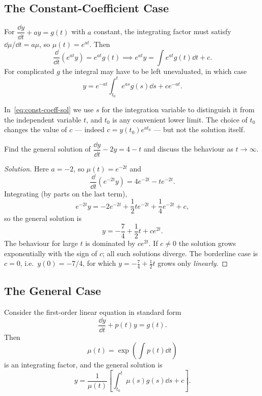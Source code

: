 \subsection{The Constant-Coefficient Case}

For \(\dfrac{\dd y}{\dd t} + ay = g(t)\) with \(a\) constant, the integrating factor must
satisfy \(\dd\mu/\dd t = a\mu\), so \(\mu(t) = e^{at}\). Then
\[
	\frac{\dd}{\dd t}\left( e^{at} y \right) = e^{at} g(t)
	\implies e^{at} y = \int e^{at} g(t) \dd t + c.
\]
For complicated \(g\) the integral may have to be left unevaluated, in which case
\begin{equation}\label{eq:const-coeff-sol}
	y = e^{-at} \int_{t_0}^{t} e^{as} g(s) \dd s + c e^{-at}.
\end{equation}

\begin{note}
	In~\eqref{eq:const-coeff-sol} we use \(s\) for the integration variable to distinguish
	it from the independent variable \(t\), and \(t_0\) is any convenient lower limit. The
	choice of \(t_0\) changes the value of \(c\) --- indeed \(c = y(t_0) e^{a t_0}\) ---
	but not the solution itself.
\end{note}

\begin{eg}
	Find the general solution of \(\dfrac{\dd y}{\dd t} - 2y = 4 - t\) and discuss the
	behaviour as \(t \to \infty\).
\end{eg}

\begin{proof}[Solution]
	Here \(a = -2\), so \(\mu(t) = e^{-2t}\) and
	\[
		\frac{\dd}{\dd t}\left( e^{-2t} y \right) = 4e^{-2t} - te^{-2t}.
	\]
	Integrating (by parts on the last term),
	\[
		e^{-2t} y = -2e^{-2t} + \frac{1}{2}te^{-2t} + \frac{1}{4}e^{-2t} + c,
	\]
	so the general solution is
	\[
		y = -\frac{7}{4} + \frac{1}{2}t + c e^{2t}.
	\]
	The behaviour for large \(t\) is dominated by \(ce^{2t}\). If \(c \neq 0\) the
	solution grows exponentially with the sign of \(c\); all such solutions diverge. The
	borderline case is \(c = 0\), i.e.\ \(y(0) = -7/4\), for which
	\(y = -\frac74 + \frac12 t\) grows only \emph{linearly}.
\end{proof}

\subsection{The General Case}

\begin{theorem}\label{thm:integrating-factor}
	Consider the first-order linear equation in standard form
	\[
		\frac{\dd y}{\dd t} + p(t) y = g(t).
	\]
	Then
	\begin{equation}\label{eq:mu}
		\mu(t) = \exp\left( \int p(t) \dd t \right)
	\end{equation}
	is an integrating factor, and the general solution is
	\begin{equation}\label{eq:gen-lin-sol}
		y = \frac{1}{\mu(t)}\left[ \int_{t_0}^{t} \mu(s) g(s) \dd s + c \right].
	\end{equation}
\end{theorem}

